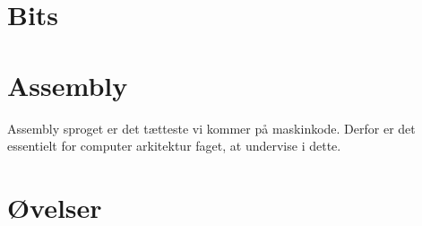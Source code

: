 

\chapter{Bits}
    
    
\chapter{Assembly}
Assembly sproget er det tætteste vi kommer på maskinkode.
Derfor er det essentielt for computer arkitektur faget, at undervise i dette.
    
\chapter{Øvelser}
    
